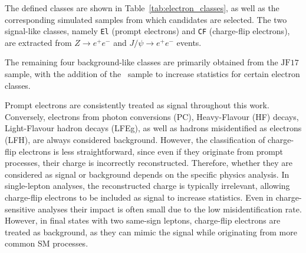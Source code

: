 The defined classes are shown in Table~\ref{tab:electron_classes}, as well as the corresponding simulated samples from which candidates are selected. The two signal-like classes, namely \texttt{El} (prompt electrons) and \texttt{CF} (charge-flip electrons), are extracted from $Z \rightarrow e^{+}e^{-}$ and $J/\psi \rightarrow e^{+}e^{-}$ events.

The remaining four background-like classes are primarily obtained from the $\text{JF}17$ sample, with the addition of the \ttbar\ sample to increase statistics for certain electron classes.

Prompt electrons are consistently treated as signal throughout this work. Conversely, electrons from photon conversions (PC), Heavy-Flavour (HF) decays, Light-Flavour hadron decays (LFEg), as well as hadrons misidentified as electrons (LFH), are always considered background. However, the classification of charge-flip electrons is less straightforward, since even if they originate from prompt processes, their charge is incorrectly reconstructed. Therefore, whether they are considered as signal or background depends on the specific physics analysis.
In single-lepton analyses, the reconstructed charge is typically irrelevant, allowing charge-flip electrons to be included as signal to increase statistics. Even in charge-sensitive analyses their impact is often small due to the low misidentification rate. However, in final states with two same-sign leptons, charge-flip electrons are treated as background, as they can mimic the signal while originating from more common SM processes.

